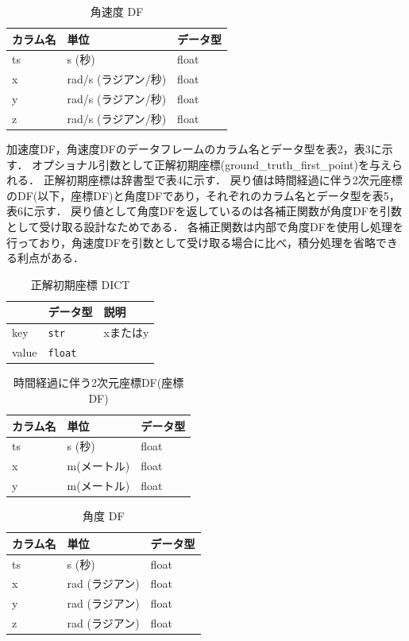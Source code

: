 \begin{table}[ht]
	\caption{角速度 DF}
	\centering
	\begin{tabular}{lll}
		\toprule
		カラム名 & 単位             & データ型  \\
		\midrule
		ts   & s (秒)          & float \\
		x    & rad/s (ラジアン/秒) & float \\
		y    & rad/s (ラジアン/秒) & float \\
		z    & rad/s (ラジアン/秒) & float \\
		\bottomrule
	\end{tabular}
\end{table}


加速度DF，角速度DFのデータフレームのカラム名とデータ型を表2，表3に示す．
オプショナル引数として正解初期座標(ground\_truth\_first\_point)を与えられる．
正解初期座標は辞書型で表4に示す．
戻り値は時間経過に伴う2次元座標のDF(以下，座標DF)と角度DFであり，それぞれのカラム名とデータ型を表5，表6に示す．
戻り値として角度DFを返しているのは各補正関数が角度DFを引数として受け取る設計なためである．
各補正関数は内部で角度DFを使用し処理を行っており，角速度DFを引数として受け取る場合に比べ，積分処理を省略できる利点がある．

\begin{table}[ht]
	\caption{正解初期座標 DICT}
	\centering
	\label{tab:first-coord-dict}
	\begin{tabular}{lll}
		\hline
		      & {データ型}         & {説明}          \\ \hline
		key   & \texttt{str}   & xまたはy         \\ \hline
		value & \texttt{float} & \makecell{座標} \\ \hline
	\end{tabular}
\end{table}


\begin{table}[ht]
  \caption{時間経過に伴う2次元座標DF(座標DF)}
	\centering
	\begin{tabular}{lll}
		\toprule
		カラム名 & 単位      & データ型  \\
		\midrule
		ts   & s (秒)   & float \\
		x    & m(メートル) & float \\
		y    & m(メートル) & float \\
		\bottomrule
	\end{tabular}
\end{table}


\begin{table}[ht]
  \caption{角度 DF}
	\centering
	\begin{tabular}{lll}
		\toprule
		カラム名 & 単位         & データ型  \\
		\midrule
		ts   & s (秒)      & float \\
		x    & rad (ラジアン) & float \\
		y    & rad (ラジアン) & float \\
		z    & rad (ラジアン) & float \\
		\bottomrule
	\end{tabular}
\end{table}


